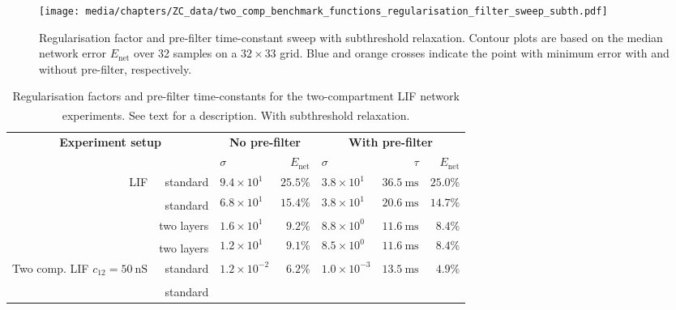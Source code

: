 \begin{figure}[p]
	\texttt{[image: media/chapters/ZC\_data/two\_comp\_benchmark\_functions\_regularisation\_filter\_sweep\_subth.pdf]}
	\caption[Regularisation factor and pre-filter time-constant sweep with subthreshold relaxation]{Regularisation factor and pre-filter time-constant sweep with subthreshold relaxation. Contour plots are based on the median network error $E_\mathrm{net}$ over 32 samples on a $32 \times 33$ grid. Blue and orange crosses indicate the point with minimum error with and without pre-filter, respectively.}
	\label{fig:regularization_parameter_sweep_subth}
\end{figure}

\begin{table}
	\caption[Regularisation factors and pre-filter time-constants.]{Regularisation factors and pre-filter time-constants for the two-compartment LIF network experiments. See text for a description.
	\textsuperscript{\dag}With subthreshold relaxation.
	}
	\label{tbl:regularization_paremteters}
	\centering
	\small
	\setlength{\tabcolsep}{10.75pt}
	\sffamily
	\begin{tabular}{r r l r l r r}
		\toprule
		\multicolumn{2}{c}{\textbf{Experiment setup}} &
		\multicolumn{2}{c}{\textbf{No pre-filter}} &
		\multicolumn{3}{c}{\textbf{With pre-filter}} \\
		\cmidrule{1-2}\cmidrule(l){3-4}\cmidrule(l){5-7}
		& & $\sigma$ & $E_\mathrm{net}$ & $\sigma$ & $\tau$ & $E_\mathrm{net}$ \\
		\midrule
		\multirow{4}{2.7cm}[-0.5em]{\raggedleft LIF}
			& standard
			& $9.4 \times 10^{1}$ & $25.5\%$
			& $3.8 \times 10^{1}$ & $\SI{36.5}{\milli\second}$ & $25.0\%$ \\
			& standard\textsuperscript{\dag}
			& $6.8 \times 10^{1}$ & $15.4\%$
			& $3.8 \times 10^{1}$ & $\SI{20.6}{\milli\second}$ & $14.7\%$ \\
		\cmidrule{2-7}
			& two layers
			& $1.6 \times 10^{1}$ & $9.2\%$
			& $8.8 \times 10^{0}$ & $\SI{11.6}{\milli\second}$ & $8.4\%$ \\
			& two layers\textsuperscript{\dag}
			& $1.2 \times 10^{1}$ & $9.1\%$
			& $8.5 \times 10^{0}$ & $\SI{11.6}{\milli\second}$ & $8.4\%$ \\
		\midrule
		\multirow{4}{2.7cm}[-0.5em]{\raggedleft Two comp. LIF $c_{12} = \SI{50}{\nano\siemens}$}
			& standard
			& $1.2 \times 10^{-2}$ & $6.2\%$
			& $1.0 \times 10^{-3}$ & $\SI{13.5}{\milli\second}$ & $4.9\%$ \\
			& standard\textsuperscript{\dag}

\end{tabular}
\end{table}
